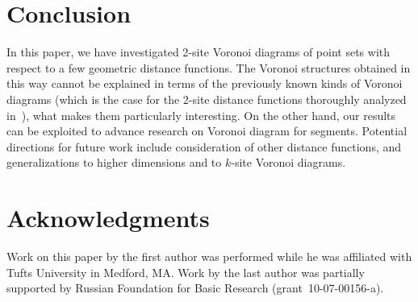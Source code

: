 \documentclass[10pt, conference, compsocconf]{IEEEtran}
\begin{document}
\section{Conclusion}

\label{S-conclusion}

In this paper, we have investigated 2-site Voronoi diagrams of point sets
with respect to a few geometric distance functions.  The Voronoi structures
obtained in this way cannot be explained in terms of the previously known
kinds of Voronoi diagrams (which is the case for the 2-site distance
functions thoroughly analyzed in~\cite{BDD02}), what makes them particularly
interesting.  On the other hand, our results can be exploited to advance
research on Voronoi diagram for segments.  Potential directions for future
work include consideration of other distance functions, and generalizations
to higher dimensions and to $k$-site Voronoi diagrams.



\section*{Acknowledgments}

Work on this paper by the first author was performed while he was
affiliated with Tufts University in Medford, MA.
Work by the last author was partially supported by
Russian Foundation for Basic Research (grant~10-07-00156-a).
\end{document}
